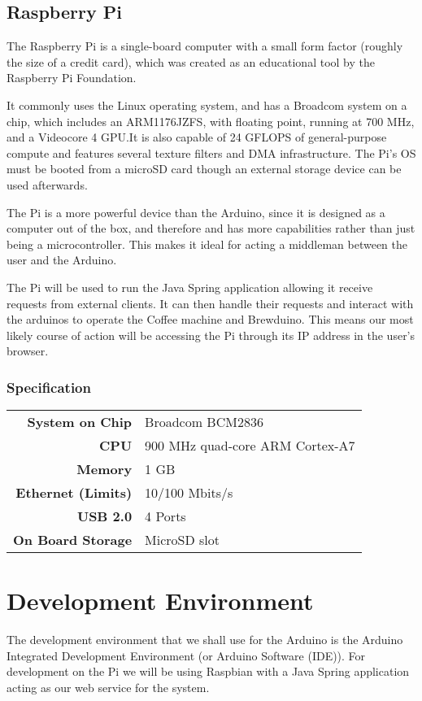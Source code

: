 \documentclass[12pt, a4paper]{article}
\begin{document}
\subsection{Raspberry Pi}
The Raspberry Pi is a single-board computer with a small form factor (roughly
the size of a credit card), which was created as an educational tool by the
Raspberry Pi Foundation. 

It commonly uses the Linux operating system, and has a Broadcom system on a
chip, which includes an ARM1176JZFS, with floating point, running at 700 MHz,
and a Videocore 4 GPU.It is also capable of 24 GFLOPS of general-purpose
compute and features several texture filters and DMA infrastructure. The Pi’s OS
must be booted from a microSD card though an external storage device can be used
afterwards.

The Pi is a more powerful device than the Arduino, since it is designed as a
computer out of the box, and therefore and has more capabilities rather than
just being a microcontroller. This makes it ideal for acting a middleman between
the user and the Arduino.

The Pi will be used to run the Java Spring application allowing it receive 
requests from external clients. It can then handle their requests and interact 
with the arduinos to operate the Coffee machine and Brewduino. This means our
most likely course of action will be accessing the Pi through its IP address in
the user's browser.

\subsubsection{Specification}
\begin{tabular}{>{\bfseries}r l}
	System on Chip & Broadcom BCM2836 \\
	CPU & 900 MHz quad-core ARM Cortex-A7 \\
	Memory & 1 GB \\
	Ethernet (Limits) & 10/100 Mbits/s \\
	USB 2.0 & 4 Ports \\
	On Board Storage & MicroSD slot \\
\end{tabular}

\newpage

\section{Development Environment}
The development environment that we shall use for the Arduino is the Arduino
Integrated Development Environment (or Arduino Software (IDE)). For development
on the Pi we will be using Raspbian with a Java Spring application acting as our
web service for the system.
\end{document}
